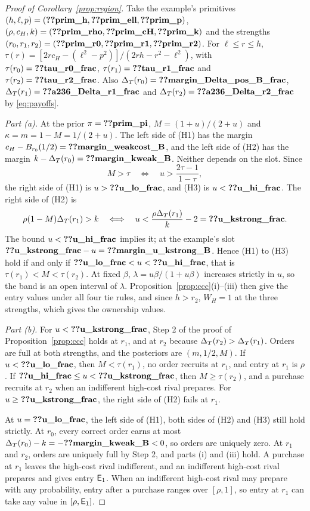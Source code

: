 \begin{proof}[Proof of Corollary~\ref{prop:region}]
Take the example's primitives \((h,\ell,p)=(\reg{prim_h},\reg{prim_ell},\reg{prim_p})\),
\((\rho,c_H,k)=(\reg{prim_rho},\reg{prim_cH},\reg{prim_k})\) and the strengths
\((r_0,r_1,r_2)=(\reg{prim_r0},\reg{prim_r1},\reg{prim_r2})\). For \(\ell\le r\le h\),
\(\tau(r)=[2r c_H-(\ell^2-p^2)]/(2rh-r^2-\ell^2)\), with
\(\tau(r_0)=\reg{tau_r0_frac}\), \(\tau(r_1)=\reg{tau_r1_frac}\) and \(\tau(r_2)=\reg{tau_r2_frac}\). Also
\(\DT(r_0)=\reg{margin_Delta_pos_B_frac}\), \(\DT(r_1)=\reg{a236_Delta_r1_frac}\) and \(\DT(r_2)=\reg{a236_Delta_r2_frac}\) by \eqref{eq:payoffs}.

\emph{Part (a).} At the prior \(\pi=\reg{prim_pi}\), \(M=(1+u)/(2+u)\) and \(\kappa=m=1-M=1/(2+u)\). The left side of (H1) has the
margin \(c_H-B_{r_0}(1/2)=\reg{margin_weakcost_B}\), and the left side of (H2) has the margin
\(k-\DT(r_0)=\reg{margin_kweak_B}\). Neither depends on the slot. Since
\[
M>\tau\quad\Longleftrightarrow\quad u>\frac{2\tau-1}{1-\tau},
\]
the right side of (H1) is \(u>\reg{u_lo_frac}\), and (H3) is \(u<\reg{u_hi_frac}\). The right side of (H2) is
\[
\rho(1-M)\DT(r_1)>k\quad\Longleftrightarrow\quad u<\frac{\rho\DT(r_1)}{k}-2=\reg{u_kstrong_frac}.
\]
The bound \(u<\reg{u_hi_frac}\) implies it; at
the example's slot \(\reg{u_kstrong_frac}-u=\reg{margin_u_kstrong_B}\).
Hence (H1) to (H3) hold if and only if \(\reg{u_lo_frac}<u<\reg{u_hi_frac}\), that is \(\tau(r_1)<M<\tau(r_2)\). At
fixed \(\beta\), \(\lambda=u\beta/(1+u\beta)\) increases strictly in \(u\), so the band is an open interval of
\(\lambda\). Proposition~\ref{prop:ccc}(i)--(iii) then give the entry values under all four tie rules, and since
\(h>r_2\), \(W_H=1\) at the three strengths, which gives the ownership values.

\emph{Part (b).} For \(u<\reg{u_kstrong_frac}\), Step 2 of the proof of Proposition~\ref{prop:ccc} holds at \(r_1\),
and at \(r_2\) because \(\Delta_T(r_2)>\Delta_T(r_1)\). Orders are full at both strengths, and the posteriors are
\((m,1/2,M)\). If \(u<\reg{u_lo_frac}\), then \(M<\tau(r_1)\), no order recruits at \(r_1\), and entry at \(r_1\) is
\(\rho\). If \(\reg{u_hi_frac}\le u<\reg{u_kstrong_frac}\), then \(M\ge\tau(r_2)\), and a purchase recruits at \(r_2\)
when an indifferent high-cost rival prepares. For \(u\ge\reg{u_kstrong_frac}\), the right side of (H2) fails at \(r_1\).

At \(u=\reg{u_lo_frac}\), the left side of (H1), both sides of (H2) and (H3) still hold strictly. At \(r_0\), every
correct order earns at most \(\DT(r_0)-k=-\reg{margin_kweak_B}<0\), so orders are uniquely zero. At \(r_1\) and \(r_2\), orders are
uniquely full by Step 2, and parts (i) and (iii) hold. A purchase at \(r_1\) leaves the high-cost rival indifferent, and
an indifferent high-cost rival prepares and gives entry \(\mathsf{E}_1\). When an indifferent high-cost rival may prepare with any probability, entry after a purchase ranges over \([\rho,1]\), so entry at \(r_1\)
can take any value in \([\rho,\mathsf{E}_1]\).


\end{proof}
